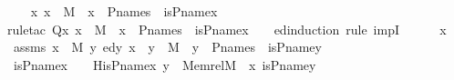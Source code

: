 \begin{isabellebody}
%
\isadelimproof
\isanewline
%
\endisadelimproof
%
\isatagproof
{}\isamarkupfalse%
{\isacharminus}{\kern0pt}\isanewline
\ \ \isamarkupfalse%
\ {\isachardoublequoteopen}{\isasymAnd}x{\isachardot}{\kern0pt}\ x\ {\isasymin}\ M\ {\isasymlongrightarrow}\ x\ {\isasymin}\ P{\isacharunderscore}{\kern0pt}names\ {\isasymlongleftrightarrow}\ is{\isacharunderscore}{\kern0pt}P{\isacharunderscore}{\kern0pt}name{\isacharparenleft}{\kern0pt}x{\isacharparenright}{\kern0pt}\ {\isacharequal}{\kern0pt}\ {}{\isachardoublequoteclose}\ \isanewline
\ \ \isamarkupfalse%
{\isacharparenleft}{\kern0pt}rule{\isacharunderscore}{\kern0pt}tac\ Q{\isacharequal}{\kern0pt}{\isachardoublequoteopen}{\isasymlambda}x{\isachardot}{\kern0pt}\ x\ {\isasymin}\ M\ {\isasymlongrightarrow}\ x\ {\isasymin}\ P{\isacharunderscore}{\kern0pt}names\ {\isasymlongleftrightarrow}\ is{\isacharunderscore}{\kern0pt}P{\isacharunderscore}{\kern0pt}name{\isacharparenleft}{\kern0pt}x{\isacharparenright}{\kern0pt}\ {\isacharequal}{\kern0pt}\ {}{\isachardoublequoteclose}\ \ ed{\isacharunderscore}{\kern0pt}induction{\isacharcomma}{\kern0pt}\ rule\ impI{\isacharparenright}{\kern0pt}\isanewline
\ \ \ \ \isamarkupfalse%
\ x\ \isamarkupfalse%
\ assms{}{\isacharcolon}{\kern0pt}\ {\isachardoublequoteopen}x\ {\isasymin}\ M{\isachardoublequoteclose}\ {\isachardoublequoteopen}{\isacharparenleft}{\kern0pt}{\isasymAnd}y{\isachardot}{\kern0pt}\ ed{\isacharparenleft}{\kern0pt}y{\isacharcomma}{\kern0pt}\ x{\isacharparenright}{\kern0pt}\ {\isasymLongrightarrow}\ y\ {\isasymin}\ M\ {\isasymlongrightarrow}\ y\ {\isasymin}\ P{\isacharunderscore}{\kern0pt}names\ {\isasymlongleftrightarrow}\ is{\isacharunderscore}{\kern0pt}P{\isacharunderscore}{\kern0pt}name{\isacharparenleft}{\kern0pt}y{\isacharparenright}{\kern0pt}\ {\isacharequal}{\kern0pt}\ {}{\isacharparenright}{\kern0pt}{\isachardoublequoteclose}\isanewline
\ \ \ \ \isamarkupfalse%
\ {\isachardoublequoteopen}is{\isacharunderscore}{\kern0pt}P{\isacharunderscore}{\kern0pt}name{\isacharparenleft}{\kern0pt}x{\isacharparenright}{\kern0pt}\ {\isacharequal}{\kern0pt}\ {}\ {\isasymlongleftrightarrow}\ His{\isacharunderscore}{\kern0pt}P{\isacharunderscore}{\kern0pt}name{\isacharparenleft}{\kern0pt}x{\isacharcomma}{\kern0pt}\ {\isasymlambda}y\ {\isasymin}\ Memrel{\isacharparenleft}{\kern0pt}M{\isacharparenright}{\kern0pt}{\isacharcircum}{\kern0pt}{\isacharplus}{\kern0pt}\ {\isacharminus}{\kern0pt}{\isacharbackquote}{\kern0pt}{\isacharbackquote}{\kern0pt}\ {\isacharbraceleft}{\kern0pt}x{\isacharbraceright}{\kern0pt}{\isachardot}{\kern0pt}\ is{\isacharunderscore}{\kern0pt}P{\isacharunderscore}{\kern0pt}name{\isacharparenleft}{\kern0pt}y{\isacharparenright}{\kern0pt}{\isacharparenright}{\kern0pt}\ {\isacharequal}{\kern0pt}\ {}{\isachardoublequoteclose}\isanewline

\end{isabellebody}
